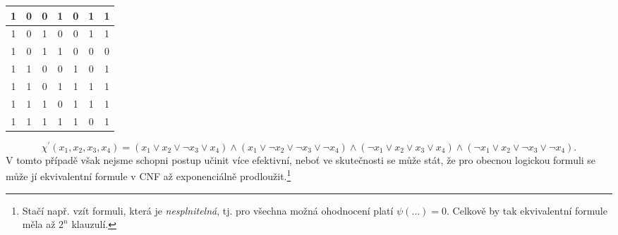 \begin{example}
\begin{table}[h]
\begin{tabular}{|c|c|c|c|c|c|c|}
        1     & 0     & 0     & 1     & 0             & 1                                                 & 1                                    \\ \hline
        1     & 0     & 1     & 0     & 0             & 1                                                 & 1                                    \\ \hline
        1     & 0     & 1     & 1     & 0             & 0                                                 & 0                                    \\ \hline
        1     & 1     & 0     & 0     & 1             & 0                                                 & 1                                    \\ \hline
        1     & 1     & 0     & 1     & 1             & 1                                                 & 1                                    \\ \hline
        1     & 1     & 1     & 0     & 1             & 1                                                 & 1                                    \\ \hline
        1     & 1     & 1     & 1     & 1             & 0                                                 & 1                                    \\ \hline
        \end{tabular}
    \end{table}
    \[\chi^\prime(x_1,x_2,x_3,x_4)=(x_1\lor x_2\lor \neg x_3\lor x_4)\land(x_1\lor\neg x_2\lor\neg x_3\lor\neg x_4)\land(\neg x_1\lor x_2\lor x_3\lor x_4)\land(\neg x_1\lor x_2\lor \neg x_3\lor\neg x_4).\]
    V tomto případě však nejsme schopni postup učinit více efektivní, neboť ve skutečnosti se může stát, že pro obecnou logickou formuli se může jí ekvivalentní formule v CNF až exponenciálně prodloužit.\footnote{Stačí např. vzít formuli, která je \emph{nesplnitelná}, tj. pro všechna možná ohodnocení platí $\psi(\dots)=0$. Celkově by tak ekvivalentní formule měla až $2^n$ klauzulí.}
\end{example}